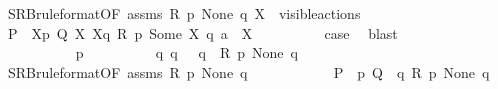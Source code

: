 \begin{isabellebody}
\ SRB{\isacharunderscore}{\kern0pt}ruleformat{\isacharparenleft}{\kern0pt}{}{\isacharparenright}{\kern0pt}{\isacharbrackleft}{\kern0pt}OF\ assms{\isacharparenleft}{\kern0pt}{}{\isacharparenright}{\kern0pt}\ {\isacartoucheopen}R\ p\ None\ q{\isacartoucheclose}\ {\isacartoucheopen}X\ {\isasymsubseteq}\ visible{\isacharunderscore}{\kern0pt}actions{\isacartoucheclose}{\isacharbrackright}{\kern0pt}\ \isacommand{{\isachardot}{\kern0pt}}\isamarkupfalse%
\isanewline
\ \ \ \ \isanewline
\ \ \ \ \ \ \ \ \isamarkupfalse%
\ {\isacartoucheopen}P{\isacharprime}{\kern0pt}\ {\isacharequal}{\kern0pt}\ {\isasymtheta}{\isacharbrackleft}{\kern0pt}X{\isacharbrackright}{\kern0pt}{\isacharparenleft}{\kern0pt}p{\isacharparenright}{\kern0pt}{\isacartoucheclose}\ {\isacartoucheopen}Q\ {\isasymlongmapsto}\isactrlsup {\isasymtheta}{\isasymepsilon}{\isacharbrackleft}{\kern0pt}X{\isacharbrackright}{\kern0pt}\ {\isasymtheta}{\isacharbrackleft}{\kern0pt}X{\isacharbrackright}{\kern0pt}{\isacharparenleft}{\kern0pt}q{\isacharparenright}{\kern0pt}{\isacartoucheclose}\ {\isacartoucheopen}R\ p\ {\isacharparenleft}{\kern0pt}Some\ X{\isacharparenright}{\kern0pt}\ q{\isacartoucheclose}\ {\isacartoucheopen}a\ {\isacharequal}{\kern0pt}\ {\isasymepsilon}{\isacharbrackleft}{\kern0pt}X{\isacharbrackright}{\kern0pt}{\isacartoucheclose}\isanewline
\ \ \ \ \ \ \ \ \isamarkupfalse%
\ {\isacharquery}{\kern0pt}case\ \isamarkupfalse%
\ blast\isanewline
\ \ \ \ \ \ \isamarkupfalse%
\isanewline
\ \ \ \ \ \ \ \ \isamarkupfalse%
\ {\isacharparenleft}{\kern0pt}{}\ p{\isacharprime}{\kern0pt}{\isacharparenright}{\kern0pt}\isanewline
\ \ \ \ \ \ \ \ \isamarkupfalse%
\ {\isacartoucheopen}{\isasymexists}q{\isacharprime}{\kern0pt}{\isachardot}{\kern0pt}\ q\ {\isasymlongmapsto}{\isasymtau}\ \ q{\isacharprime}{\kern0pt}\ {\isasymand}\ R\ p{\isacharprime}{\kern0pt}\ None\ q{\isacharprime}{\kern0pt}{\isacartoucheclose}\ \isamarkupfalse%
\ SRB{\isacharunderscore}{\kern0pt}ruleformat{\isacharparenleft}{\kern0pt}{}{\isacharparenright}{\kern0pt}{\isacharbrackleft}{\kern0pt}OF\ assms{\isacharparenleft}{\kern0pt}{}{\isacharparenright}{\kern0pt}\ {\isacartoucheopen}R\ p\ None\ q{\isacartoucheclose}\ {}{\isacharparenleft}{\kern0pt}{}{\isacharparenright}{\kern0pt}{\isacharbrackright}{\kern0pt}\ \isacommand{{\isachardot}{\kern0pt}}\isamarkupfalse%
\isanewline
\ \ \ \ \ \ \ \ \isamarkupfalse%
\ {\isacartoucheopen}P\ {\isacharequal}{\kern0pt}\ {\isasymtheta}{\isacharparenleft}{\kern0pt}p{\isacharparenright}{\kern0pt}{\isacartoucheclose}\ {\isacartoucheopen}Q\ {\isacharequal}{\kern0pt}\ {\isasymtheta}{\isacharparenleft}{\kern0pt}q{\isacharparenright}{\kern0pt}{\isacartoucheclose}\ {\isacartoucheopen}R\ p\ None\ q{\isacartoucheclose}\ \isamarkupfalse%

\end{isabellebody}
